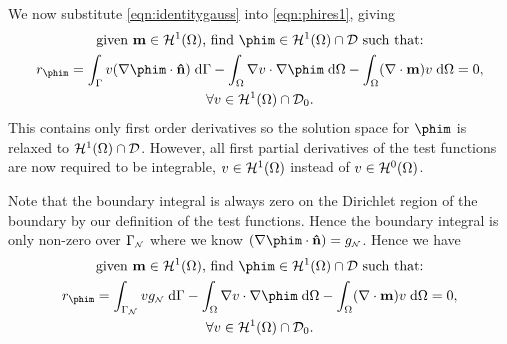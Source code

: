 We now substitute \eqref{eqn:identitygauss} into \eqref{eqn:phires1}, giving
\begin{gather}
   \text{given $\mv \in \sob^1(\magd)$, find $\phim \in \sob^1(\magd) \cap \Dfs$ such that:} \notag \\
  r_{\phim} = \int_{\boundd} v (\nabla \phim \cdot \nv) \d \boundd
  - \int_\magd \nabla v \cdot \nabla \phim \d \magd
  - \int_\magd (\nabla \cdot \mv) v \d \magd = 0
  , \notag \\
  \forall v \in \sob^1(\magd) \cap \Dfs_0. \notag
\end{gather}
This contains only first order derivatives so the solution space for $\phim$ is relaxed to $\mathcal{H}^1(\Omega) \cap \mathcal{D}$. However, all first partial derivatives of the test functions are now required to be integrable, \ie $v \in \mathcal{H}^1(\Omega)$ instead of $v \in \mathcal{H}^0(\Omega)$.

Note that the boundary integral is always zero on the Dirichlet region of the boundary by our definition of the test functions. Hence the boundary integral is only non-zero over ${\Gamma}_{{\scriptscriptstyle{\mathcal{N}}}}$ where we know $(\nabla \phim \cdot \nv) = g_{\Neu}$. Hence we have
\begin{gather}
   \text{given $\mv \in \sob^1(\magd)$, find $\phim \in \sob^1(\magd) \cap \Dfs$ such that:} \notag \\
  r_{\phim} = \int_{\boundd_\Neu} v g_\Neu \d \boundd
  - \int_\magd \nabla v \cdot \nabla \phim \d \magd
  - \int_\magd (\nabla \cdot \mv) v \d \magd = 0
  , \label{res:contphi} \\
  \forall v \in \sob^1(\magd) \cap \Dfs_0. \notag
\end{gather}



